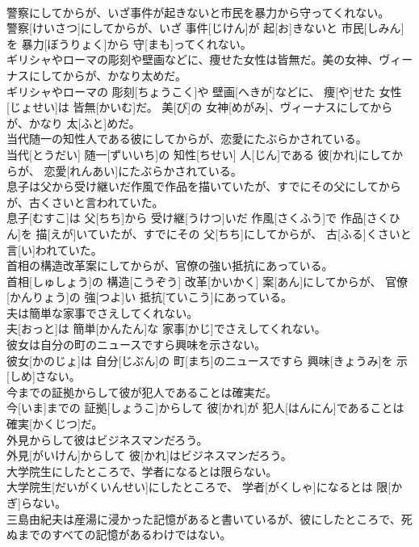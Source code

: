 \documentclass[8pt]{extreport}
\begin{document}
\begin{CJK}{UTF8}{min}
\\	警察にしてからが、いざ事件が起きないと市民を暴力から守ってくれない。	
\\	警察[けいさつ]にしてからが、いざ 事件[じけん]が 起[お]きないと 市民[しみん]を 暴力[ぼうりょく]から 守[まも]ってくれない。
\\	ギリシャやローマの彫刻や壁画などに、痩せた女性は皆無だ。美の女神、ヴィーナスにしてからが、かなり太めだ。	
\\	ギリシャやローマの 彫刻[ちょうこく]や 壁画[へきが]などに、 痩[や]せた 女性[じょせい]は 皆無[かいむ]だ。 美[び]の 女神[めがみ]、ヴィーナスにしてからが、かなり 太[ふと]めだ。
\\	当代随一の知性人である彼にしてからが、恋愛にたぶらかされている。	
\\	当代[とうだい] 随一[ずいいち]の 知性[ちせい] 人[じん]である 彼[かれ]にしてからが、 恋愛[れんあい]にたぶらかされている。
\\	息子は父から受け継いだ作風で作品を描いていたが、すでにその父にしてからが、古くさいと言われていた。	
\\	息子[むすこ]は 父[ちち]から 受け継[うけつ]いだ 作風[さくふう]で 作品[さくひん]を 描[えが]いていたが、すでにその 父[ちち]にしてからが、 古[ふる]くさいと 言[い]われていた。
\\	首相の構造改革案にしてからが、官僚の強い抵抗にあっている。	
\\	首相[しゅしょう]の 構造[こうぞう] 改革[かいかく] 案[あん]にしてからが、 官僚[かんりょう]の 強[つよ]い 抵抗[ていこう]にあっている。
\\	夫は簡単な家事でさえしてくれない。	
\\	夫[おっと]は 簡単[かんたん]な 家事[かじ]でさえしてくれない。
\\	彼女は自分の町のニュースですら興味を示さない。	
\\	彼女[かのじょ]は 自分[じぶん]の 町[まち]のニュースですら 興味[きょうみ]を 示[しめ]さない。
\\	今までの証拠からして彼が犯人であることは確実だ。	
\\	今[いま]までの 証拠[しょうこ]からして 彼[かれ]が 犯人[はんにん]であることは 確実[かくじつ]だ。
\\	外見からして彼はビジネスマンだろう。	
\\	外見[がいけん]からして 彼[かれ]はビジネスマンだろう。
\\	大学院生にしたところで、学者になるとは限らない。	
\\	大学院生[だいがくいんせい]にしたところで、 学者[がくしゃ]になるとは 限[かぎ]らない。
\\	三島由紀夫は産湯に浸かった記憶があると書いているが、彼にしたところで、死ぬまでのすべての記憶があるわけではない。	

\end{CJK}
\end{document}
